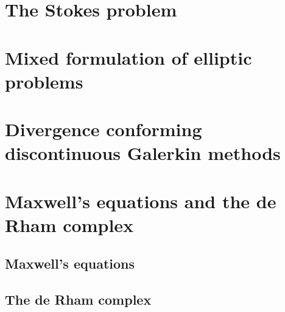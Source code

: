 \chapter{The Stokes problem}
\label{cha:stokes}


\chapter{Mixed formulation of elliptic problems}
\label{cha:darcy}


\chapter{Divergence conforming discontinuous Galerkin methods}
\label{cha:hdivdg}


\chapter{Maxwell's equations and the de Rham complex}
\section{Maxwell's equations}
\label{cha:maxwell}


\section{The de Rham complex}
\label{cha:derham}




\printbibliography
\printindex


